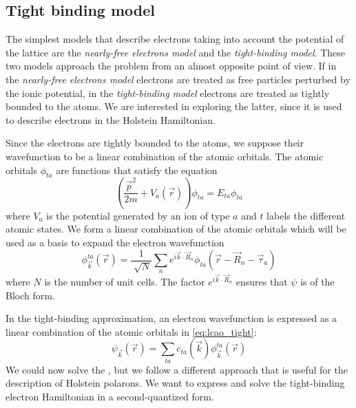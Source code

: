 \subsection{Tight binding model} \label{sec:tight-binding}
The simplest models that describe electrons taking into account the potential of the lattice are the \emph{nearly-free electrons model} and the \emph{tight-binding model}. These two models approach the problem from an almost opposite point of view. If in the \emph{nearly-free electrons model} electrons are treated as free particles perturbed by the ionic potential, in the \emph{tight-binding model} electrons are treated as tightly bounded to the atoms. We are interested in exploring the latter, since it is used to describe electrons in the Holstein Hamiltonian.

Since the electrons are tightly bounded to the atoms, we suppose their wavefunction to be a linear combination of the atomic orbitals. The atomic orbitals $\phi_{ta}$ are functions that satisfy the equation
\begin{equation}
    \left(\frac{\vec{p}^2}{2m} + V_a(\vec{r}) \right) \phi_{ta} = E_{ta}\phi_{ta}
\end{equation}
where $V_a$ is the potential generated by an ion of type $a$ and $t$ labels the different atomic states. We form a linear combination of the atomic orbitals which will be used as a basis to expand the electron wavefunction
\begin{equation} \label{eq:lcao_tight}
    \phi_\vec{k}^{ta}(\vec{r}) = \frac{1}{\sqrt[]{N}}\sum_{n} e^{i\vec{k}\cdot\vec{R}_n}\phi_{ta}(\vec{r}-\vec{R}_n - \vec{\tau}_a)
\end{equation}
where $N$ is the number of unit cells. The factor $e^{i\vec{k}\cdot\vec{R}_n}$ ensures that $\psi$ is of the Bloch form.

In the tight-binding approximation, an electron wavefunction is expressed as a linear combination of the atomic orbitals in \cref{eq:lcao_tight}:
\begin{equation} \label{eq:lcao}
    \psi_\vec{k}(\vec{r}) = \sum_{ta} c_{ta}(\vec{k}) \phi_\vec{k}^{ta}(\vec{r})
\end{equation}
We could now solve the \sche, but we follow a different approach that is useful for the description of Holstein polarons. We want to express and solve the tight-binding electron Hamiltonian in a second-quantized form.

